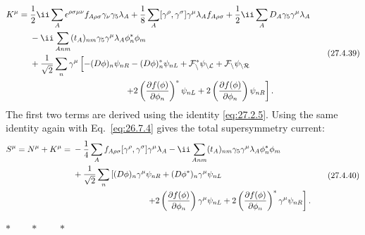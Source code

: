 \begin{equation}
  \begin{aligned}
  K^\mu={}&
  \frac12\ii\sum_A
    \epsilon^{\rho\sigma\mu\nu}f_{A\rho\sigma}
    \gamma_\nu\gamma_5\lambda_A
  +\frac18\sum_A[\gamma^\rho,\gamma^\sigma]
    \gamma^\mu\lambda_Af_{A\rho\sigma}
  +\frac12\ii\sum_AD_A\gamma_5\gamma^\mu\lambda_A
  \\
  &-\ii\sum_{Anm}(t_A)_{nm}
    \gamma_5\gamma^\mu\lambda_A\phi_n^*\phi_m
  \\
  &+\frac1{\sqrt{2}}\sum_n\gamma^\mu\left[
    -(\sl{D}\phi)_n\psi_{nR}
    -(\sl{D}\phi)_n^*\psi_{nL}
    +\mathcal{F}_n^*\psi_{nL}
    +\mathcal{F}_n\psi_{nR}
  \right.
  \\
  &\hspace{39mm}\left.
    +2\left(\frac{\partial f(\phi)}{\partial\phi_n}\right)^*\psi_{nL}
    +2\left(\frac{\partial f(\phi)}{\partial\phi_n}\right)\psi_{nR}
  \right].
  \end{aligned}
  \tag{27.4.39}\label{eq:27.4.39}
\end{equation}
The first two terms are derived using the identity \eqref{eq:27.2.5}. Using
the same identity again with Eq.~\eqref{eq:26.7.4} gives the total
supersymmetry current:
\begin{equation}
  \begin{aligned}
  S^\mu=N^\mu+K^\mu
  ={}&
  -\frac14\sum_Af_{A\rho\sigma}
    [\gamma^\rho,\gamma^\sigma]\gamma^\mu\lambda_A
  -\ii\sum_{Anm}(t_A)_{nm}
    \gamma_5\gamma^\mu\lambda_A\phi_n^*\phi_m
  \\
  &+\frac1{\sqrt{2}}\sum_n\left[
    (\sl{D}\phi)_n\gamma^\mu\psi_{nR}
    +(\sl{D}\phi^*)_n\gamma^\mu\psi_{nL}
  \right.
  \\
  &\hspace{31mm}\left.
    +2\left(\frac{\partial f(\phi)}{\partial\phi_n}\right)
      \gamma^\mu\psi_{nL}
    +2\left(\frac{\partial f(\phi)}{\partial\phi_n}\right)^*
      \gamma^\mu\psi_{nR}
  \right].
  \end{aligned}
  \tag{27.4.40}\label{eq:27.4.40}
\end{equation}

\begin{center}
\(\ast\qquad\ast\qquad\ast\)
\end{center}

